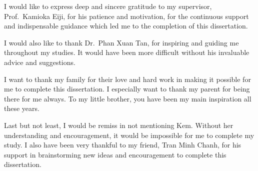 \begin{acknowledgements}

  I would like to express deep and sincere gratitude to my supervisor,
  Prof.~Kamioka Eiji,
  for his patience and motivation,
  for the continuous support and indispensable guidance which led me to the completion of this dissertation.


  I would also like to thank Dr.~Phan Xuan Tan,
  for inspiring and guiding me throughout my studies.
  It would have been more difficult without his invaluable advice and suggestions.


  I want to thank my family for their love and hard work in making it possible for me to complete this dissertation.
  I especially want to thank my parent for being there for me always.
  To my little brother,
  you have been my main inspiration all these years.


  Last but not least,
  I would be remiss in not mentioning Kem.
  Without her understanding and encouragement,
  it would be impossible for me to complete my study.
  I also have been very thankful to my friend,
  Tran Minh Chanh,
  for his support in brainstorming new ideas and encouragement to complete this dissertation.

\end{acknowledgements}
